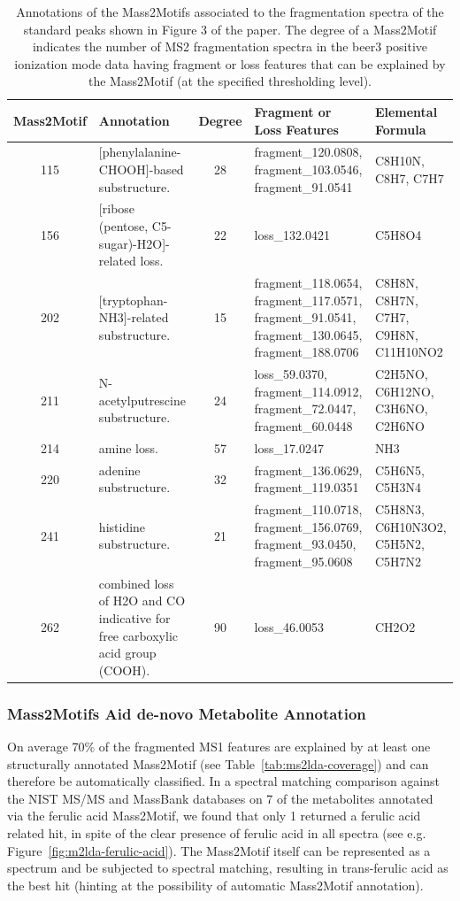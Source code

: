 \begin{table}
\begin{centering}
\begin{tabular}{| c | p{4cm} | c | p{4cm} | p{2.5cm} |}
\hline 
Mass2Motif & Annotation & Degree & Fragment or Loss Features & Elemental Formula\tabularnewline
\hline 
\hline 
115 & {[}phenylalanine-CHOOH{]}-based substructure.  & 28 & fragment\_120.0808, fragment\_103.0546, fragment\_91.0541 & C8H10N, C8H7, C7H7\tabularnewline
\hline 
156 & {[}ribose (pentose, C5-sugar)-H2O{]}-related loss.  & 22 & loss\_132.0421 & C5H8O4 \tabularnewline
\hline 
202 & {[}tryptophan-NH3{]}-related substructure.  & 15 & fragment\_118.0654, 
fragment\_117.0571, 
fragment\_91.0541, 
fragment\_130.0645,
fragment\_188.0706 & C8H8N, 
C8H7N, 
C7H7, 
C9H8N, C11H10NO2\tabularnewline
\hline 
211 & N-acetylputrescine substructure.  & 24 & loss\_59.0370, 
fragment\_114.0912, 
fragment\_72.0447, 
fragment\_60.0448 & C2H5NO, 
C6H12NO, C3H6NO, 
C2H6NO\tabularnewline
\hline 
214 & amine loss.  & 57 & loss\_17.0247  & NH3\tabularnewline
\hline 
220 & adenine substructure.  & 32 & fragment\_136.0629, 
fragment\_119.0351 & C5H6N5, 
C5H3N4\tabularnewline
\hline 
241 & histidine substructure.  & 21 & fragment\_110.0718, 
fragment\_156.0769, 
fragment\_93.0450, 
fragment\_95.0608 & C5H8N3, 
C6H10N3O2, 
C5H5N2, 
C5H7N2\tabularnewline
\hline 
262 & combined loss of H2O and CO \textendash{} indicative for free carboxylic
acid group (COOH).  & 90 & loss\_46.0053  & CH2O2 \tabularnewline
\hline 
\end{tabular}
\par\end{centering}
\caption{Annotations of the Mass2Motifs associated to the fragmentation spectra
of the standard peaks shown in Figure 3 of the paper. The degree of
a Mass2Motif indicates the number of MS2 fragmentation spectra in
the beer3 positive ionization mode data having fragment or loss features
that can be explained by the Mass2Motif (at the specified thresholding
level). \label{tab:ms2lda-standards}}
\end{table}

\subsubsection{Mass2Motifs Aid de-novo Metabolite Annotation\label{sub:ms2lda-identification}}

On average 70\% of the fragmented MS1 features are explained by at least one structurally annotated Mass2Motif (see Table~\ref{tab:ms2lda-coverage}) and can therefore be automatically classified. In a spectral matching comparison against the NIST MS/MS and MassBank databases on 7 of the metabolites annotated via the ferulic acid Mass2Motif, we found that only 1 returned a ferulic acid related hit, in spite of the clear presence of ferulic acid in all spectra (see e.g. Figure~\ref{fig:m2lda-ferulic-acid}). The Mass2Motif itself can be represented as a spectrum and be subjected to spectral matching, resulting in trans-ferulic acid as the best hit (hinting at the possibility of automatic Mass2Motif annotation). 

